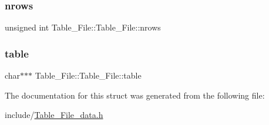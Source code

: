 \subsubsection{\texorpdfstring{nrows}{nrows}}
{\footnotesize\ttfamily unsigned int Table\+\_\+\+File\+::\+Table\+\_\+\+File\+::nrows}

\mbox{\label{struct_table___file_1_1_table___file_ab7208b87466a87a39c72659de46e37d2}} 
\subsubsection{\texorpdfstring{table}{table}}
{\footnotesize\ttfamily char$\ast$$\ast$$\ast$ Table\+\_\+\+File\+::\+Table\+\_\+\+File\+::table}



The documentation for this struct was generated from the following file\+:\begin{DoxyCompactItemize}
\item 
include/\mbox{\hyperlink{_table___file__data_8h}{Table\+\_\+\+File\+\_\+data.\+h}}\end{DoxyCompactItemize}
